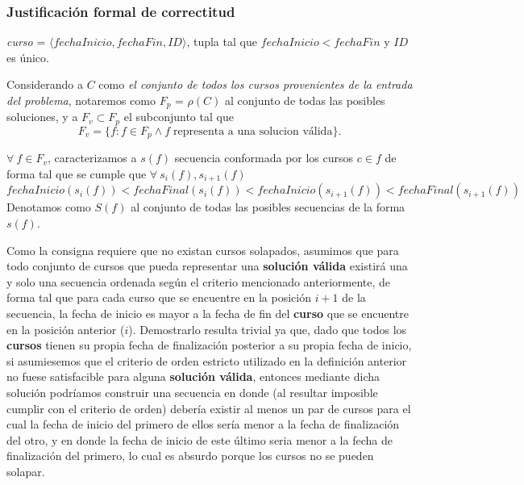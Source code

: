 \documentclass[11pt, a4paper, twoside]{article}
\begin{document}
\clearpage
\subsubsection{Justificación formal de correctitud}

\begin{notac}
\emph{curso} = $\langle fechaInicio, fechaFin, ID \rangle$, tupla tal que $fechaInicio<fechaFin$ y $ID$ es único.
\end{notac}
\begin{definicion}
Considerando a $C$ como \emph{el conjunto de todos los cursos provenientes de la entrada del problema}, notaremos como $F_p$ = $\rho(C)$ al conjunto de todas las posibles soluciones, y a $F_v\subset F_p$ el subconjunto tal que
\[
	F_v = \{f : f \in F_p \wedge f \; \text{representa a una solucion válida}\}.
\]
\end{definicion}
\begin{definicion}
$\forall \ f \in F_v$, caracterizamos a $s(f)$ secuencia conformada por 
los cursos $c \in f$ de forma tal que se cumple que $\forall \ s_{i}(f), s_{i+1}(f)$
\[
	 fechaInicio(s_{i}(f)) < fechaFinal(s_{i}(f)) < fechaInicio(s_{i+1}(f)) < fechaFinal(s_{i+1}(f))
\]
Denotamos como $S(f)$ al conjunto de todas las posibles secuencias de la forma $s(f)$.
\end{definicion}
\begin{aclaracion}
Como la consigna requiere que no existan cursos solapados, asumimos que para todo conjunto de cursos que pueda
representar una \textbf{solución válida} existirá una y solo una secuencia ordenada según el criterio mencionado
anteriormente, de forma tal que para cada curso que se encuentre en la posición $i+1$ de la secuencia, 
la fecha de inicio es mayor a la fecha de fin del \textbf{curso} que se encuentre en la posición anterior 
($i$). Demostrarlo resulta trivial ya que, dado que todos los \textbf{cursos} tienen su propia fecha de finalización
posterior a su propia fecha de inicio, si asumiesemos que el criterio de orden estricto utilizado en la definición 
anterior no fuese satisfacible para alguna \textbf{solución válida}, entonces mediante dicha solución podríamos 
construir una secuencia en donde (al resultar imposible cumplir con el criterio de orden) debería 
existir al menos un par de cursos para el cual la fecha de inicio del primero de ellos sería menor a la fecha 
de finalización del otro, y en donde la fecha de inicio de este último seria menor a la fecha de finalización del
primero, lo cual es absurdo porque los cursos no se pueden solapar.
\end{aclaracion}
\end{document}
